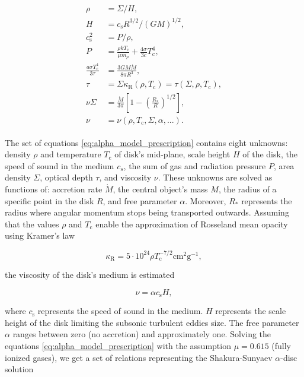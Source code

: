     \begin{align}
    \begin{split}
        \rho &= \Sigma / H, \\
        H &= c_{\mathrm{s}} R^{3/2} / (GM)^{1/2}, \\
        c_{\mathrm{s}}^2 &= P / \rho, \\
        P &= \frac{\rho k T_{\mathrm{c}}}{\mu m_p} + \frac{4 \sigma}{3 c}T_c^4, \\
        \frac{a \sigma T_{\mathrm{c}}^4}{3 \tau} &= \frac{3GM\dot{M}}{8 \pi R^3}, \\
        \tau &= \Sigma \kappa_{\mathrm{R}}(\rho, T_{\mathrm{c}}) = \tau(\Sigma, \rho, T_{\mathrm{c}}), \\
        \nu \Sigma &= \frac{\dot{M}}{3 \pi} \left[ 1 - \left( \frac{R_*}{R} \right)^{1/2} \right], \\
        \nu &= \nu(\rho, T_{\mathrm{c}}, \Sigma, \alpha, ...).
    \end{split}
    \label{eq:alpha_model_prescription}
    \end{align}

    The set of equations \eqref{eq:alpha_model_prescription} contains eight unknowns: density $\rho$ and temperature $T_{\mathrm{c}}$ of disk's mid-plane, scale height $H$ of the disk, the speed of sound in the medium $c_s$, the sum of gas and radiation pressure $P$, area density $\Sigma$, optical depth $\tau$, and viscosity $\nu$. These unknowns are solved as functions of: accretion rate $\dot{M}$, the central object's mass $M$, the radius of a specific point in the disk $R$, and free parameter $\alpha$. Moreover, $R_*$ represents the radius where angular momentum stops being transported outwards. Assuming that the values $\rho$ and $T_{\mathrm{c}}$ enable the approximation of Rosseland mean opacity using Kramer's law

    \begin{equation}
        \kappa_{\mathrm{R}} = 5 \cdot 10^{24} \rho T_{\mathrm{c}}^{-7/2} \si{\cm^2 \gram^{-1}},
    \end{equation}


    the viscosity of the disk's medium is estimated

    \begin{equation}
        \nu = \alpha c_{\mathrm{s}} H,
    \end{equation}

    where $c_{\mathrm{s}}$ represents the speed of sound in the medium. $H$ represents the scale height of the disk limiting the subsonic turbulent eddies size. The free parameter $\alpha$ ranges between zero (no accretion) and approximately one. Solving the equations \eqref{eq:alpha_model_prescription} with the assumption $\mu = 0.615$ (fully ionized gases), we get a set of relations representing the Shakura-Sunyaev $\alpha$-disc solution \cite{acpow}  

